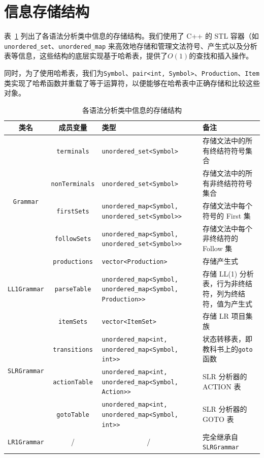 \documentclass[UTF8,openany]{ctexbook}
\begin{document}
\section{信息存储结构}

表~\ref{tab:grammar_structure} 列出了各语法分析类中信息的存储结构。我们使用了 C++ 的 STL 容器（如 \texttt{unordered\_set}、\texttt{unordered\_map} 来高效地存储和管理文法符号、产生式以及分析表等信息，这些结构的底层实现基于哈希表，提供了$O(1)$的查找和插入操作。

同时，为了使用哈希表，我们为\texttt{Symbol}、\texttt{pair<int, Symbol>}、\texttt{Production}、\texttt{Item}类实现了哈希函数并重载了等于运算符，以便能够在哈希表中正确存储和比较这些对象。

\begin{table}[htbp] \small
\centering
\caption{各语法分析类中信息的存储结构}
\label{tab:grammar_structure}
\begin{tabular}{@{}ccp{5.7cm}p{3.3cm}@{}}
\toprule
\textbf{类名} & \textbf{成员变量} & \textbf{类型} & \textbf{备注} \\
\midrule

\multirow{5}{*}{\texttt{Grammar}} 
& \texttt{terminals}       & \texttt{unordered\_set<Symbol>} & 存储文法中的所有终结符符号集合 \\
& \texttt{nonTerminals}    & \texttt{unordered\_set<Symbol>} & 存储文法中的所有非终结符符号集合 \\
& \texttt{firstSets}       & \texttt{unordered\_map<Symbol, unordered\_set<Symbol>>} & 存储文法中每个符号的 First 集 \\
& \texttt{followSets}      & \texttt{unordered\_map<Symbol, unordered\_set<Symbol>>} & 存储文法中每个非终结符的 Follow 集 \\
& \texttt{productions}     & \texttt{vector<Production>} & 存储产生式 \\
\midrule

\multirow{1}{*}{\texttt{LL1Grammar}} 
& \texttt{parseTable}      & \texttt{unordered\_map<Symbol, unordered\_map<Symbol, Production>>} & 存储 LL(1) 分析表，行为非终结符，列为终结符，值为产生式 \\
\midrule

\multirow{4}{*}{\texttt{SLRGrammar}} 
& \texttt{itemSets}        & \texttt{vector<ItemSet>} & 存储 LR 项目集族 \\
& \texttt{transitions}     & \texttt{unordered\_map<int, unordered\_map<Symbol, int>>} & 状态转移表，即教科书上的\texttt{goto}函数 \\
& \texttt{actionTable}     & \texttt{unordered\_map<int, unordered\_map<Symbol, Action>>} & SLR 分析器的 ACTION 表\\
& \texttt{gotoTable}       & \texttt{unordered\_map<int, unordered\_map<Symbol, int>>} & SLR 分析器的 GOTO 表\\

\midrule

\texttt{LR1Grammar} & \multicolumn{1}{c}{/} & \multicolumn{1}{c}{/} & 完全继承自 \texttt{SLRGrammar} \\
\bottomrule
\end{tabular}
\end{table}
\end{document}

